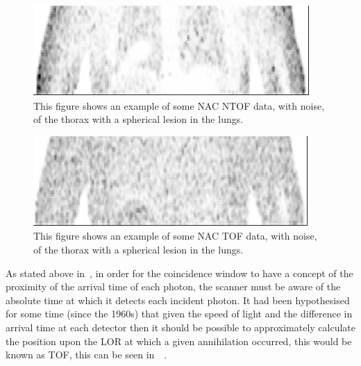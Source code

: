                 \begin{figure}
                    \centering
                    
                    \includegraphics[width=1.0\linewidth]{figures/background_non_tof_example.png}
                    
                    \captionsetup{singlelinecheck=false, justification=raggedright}
                    \caption{This figure shows an example of some \gls{NAC} \gls{NTOF} data, with noise, of the thorax with a spherical lesion in the lungs.} \label{fig:time_of_flight_pet_non_tof_example}
                \end{figure}
                
                \begin{figure}
                    \centering
                    
                    \includegraphics[width=1.0\linewidth]{figures/background_tof_example.png}
                    
                    \captionsetup{singlelinecheck=false, justification=raggedright}
                    \caption{This figure shows an example of some \gls{NAC} \gls{TOF} data, with noise, of the thorax with a spherical lesion in the lungs.} \label{fig:time_of_flight_pet_tof_example}
                \end{figure}
                
                As stated above in~, in order for the coincidence window to have a concept of the proximity of the arrival time of each photon, the scanner must be aware of the absolute time at which it detects each incident photon. It had been hypothesised for some time (since the 1960s) that given the speed of light and the difference in arrival time at each detector then it should be possible to approximately calculate the position upon the \gls{LOR} at which a given annihilation occurred, this would be known as \gls{TOF}, this can be seen in~~.
                
